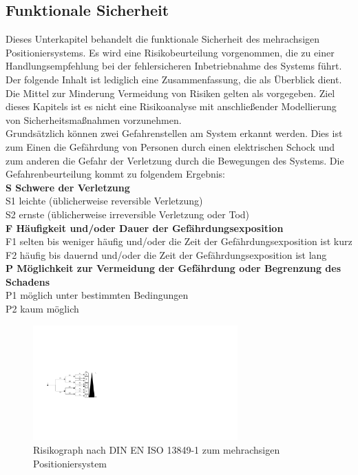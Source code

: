 \documentclass[../../../Bachelorarbeit.tex]{subfiles}
\begin{document}
\subsection{Funktionale Sicherheit} \label{sicherheit}
Dieses Unterkapitel behandelt die funktionale Sicherheit des mehrachsigen Positioniersystems. Es wird eine Risikobeurteilung vorgenommen, die zu einer Handlungsempfehlung bei der fehlersicheren Inbetriebnahme des Systems führt. Der folgende Inhalt ist lediglich eine Zusammenfassung, die als Überblick dient. Die Mittel zur Minderung \bzw Vermeidung von Risiken gelten als vorgegeben. Ziel dieses Kapitels ist es nicht eine Risikoanalyse mit anschließender Modellierung von Sicherheitsmaßnahmen vorzunehmen.\\
\bigskip \newline
Grundsätzlich können zwei Gefahrenstellen am System erkannt werden. Dies ist zum Einen die Gefährdung von Personen durch einen elektrischen Schock und zum anderen die Gefahr der Verletzung durch die Bewegungen des Systems. Die Gefahrenbeurteilung kommt zu folgendem Ergebnis:\\
\bigskip \newline
\textbf{S Schwere der Verletzung}\\
S1 leichte (üblicherweise reversible Verletzung)\\
S2 ernste (üblicherweise irreversible Verletzung oder Tod)\\
\textbf{F Häufigkeit und/oder Dauer der Gefährdungsexposition}\\
F1 selten bis weniger häufig und/oder die Zeit der Gefährdungsexposition ist kurz\\
F2 häufig bis dauernd und/oder die Zeit der Gefährdungsexposition ist lang\\
\textbf{P Möglichkeit zur Vermeidung der Gefährdung oder Begrenzung des Schadens}\\
P1 möglich unter bestimmten Bedingungen\\
P2 kaum möglich

\begin{figure}[H]
    \centering
    \includegraphics[width=0.7\textwidth]{Images/Risikograph.pdf}
    \caption[Risikograph]{Risikograph nach DIN EN ISO 13849-1 zum mehrachsigen Positioniersystem}
    \label{fig:my-img103}
\end{figure}
\end{document}
